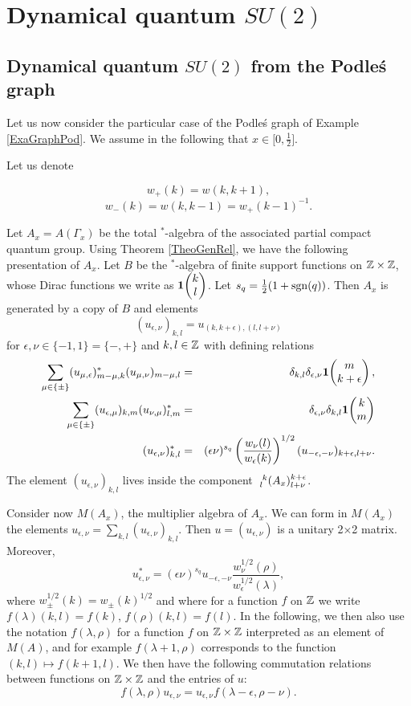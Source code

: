 
\section{Dynamical quantum $SU(2)$}

\subsection{Dynamical quantum $SU(2)$ from the Podle\'{s} graph}

Let us now consider the particular case of the Podle\'{s} graph of Example \ref{ExaGraphPod}. We assume in the following that $x\in \lbrack 0,\frac{1}{2}\rbrack$.

Let us denote

\[w_+(k) = w(k,k+1),\]\[w_-(k)  = w(k,k-1) = w_+(k-1)^{-1}.\] 

Let $A_x = A(\Gamma_x)$ be the total $^*$-algebra of the associated partial compact quantum group. Using Theorem \ref{TheoGenRel}, we have the following presentation of $A_x$. Let $B$ be the $^*$-algebra of finite support functions on $\Z\times \Z$, whose Dirac functions we write as $\UnitC{k}{l}$. Let $s_q = \frac{1}{2}(1+\sgn(q))$. Then $A_x$ is generated by a copy of $B$ and elements \[(u_{\epsilon,\nu})_{k,l} = u_{(k,k+\epsilon),(l,l+\nu)}\] for $\epsilon,\nu\in \{-1,1\}=\{-,+\}$ and $k,l\in \Z$ with defining relations \begin{eqnarray*} \sum_{\mu\in \{\pm\}} (u_{\mu,\epsilon})_{m-\mu,k}^* (u_{\mu,\nu})_{m-\mu,l}&=& \delta_{k,l} \delta_{\epsilon,\nu} \UnitC{m}{k+\epsilon},\\ \sum_{\mu\in \{\pm\}} (u_{\epsilon,\mu})_{k,m} (u_{\nu,\mu})_{l,m}^* &=& \delta_{\epsilon,\nu}\delta_{k,l} \UnitC{k}{m}\\ (u_{\epsilon,\nu})_{k,l}^* &=& (\epsilon\nu)^{s_q} \left(\frac{w_{\nu}(l)}{w_{\epsilon}(k)}\right)^{1/2} (u_{-\epsilon,-\nu})_{k+\epsilon,l+\nu}.\end{eqnarray*} The element $(u_{\epsilon,\nu})_{k,l}$ lives inside the component $\Gr{(A_x)}{k}{k+\epsilon}{l}{l+\nu}$.

Consider now $M(A_x)$, the multiplier algebra of $A_x$. We can form in $M(A_x)$ the elements $u_{\epsilon,\nu} = \sum_{k,l} (u_{\epsilon,\nu})_{k,l}$. Then $u=(u_{\epsilon,\nu})$ is a unitary 2$\times$2 matrix. Moreover, \[u_{\epsilon,\nu}^* = (\epsilon\nu)^{s_q} u_{-\epsilon,-\nu}\frac{w_{\nu}^{1/2}(\rho)}{w_{\epsilon}^{1/2}(\lambda)} ,\] where $w_{\pm}^{1/2}(k) = w_{\pm}(k)^{1/2}$ and where for a function $f$ on $\Z$ we write $f(\lambda)(k,l) = f(k)$, $f(\rho)(k,l) = f(l)$. In the following, we then also use the notation $f(\lambda,\rho)$ for a function $f$ on $\Z\times \Z$ interpreted as an element of $M(A)$, and for example $f(\lambda+1,\rho)$ corresponds to the function $(k,l)\mapsto f(k+1,l)$. We then have the following commutation relations between functions on $\Z\times \Z$ and the entries of $u$: \[f(\lambda,\rho)u_{\epsilon,\nu} = u_{\epsilon,\nu}f(\lambda-\epsilon,\rho-\nu).\]

